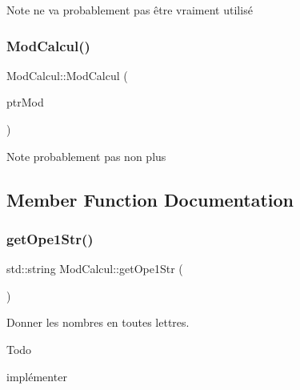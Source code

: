 \begin{DoxyNote}{Note}
ne va probablement pas être vraiment utilisé 
\end{DoxyNote}
\mbox{\label{class_mod_calcul_ad10f52bb861bf4b76e12f5bba1d97b67}} 
\subsubsection{\texorpdfstring{Mod\+Calcul()}{ModCalcul()}\hspace{0.1cm}{\footnotesize\ttfamily [2/2]}}
{\footnotesize\ttfamily Mod\+Calcul\+::\+Mod\+Calcul (\begin{DoxyParamCaption}\item[{\hyperlink{class_mod_calcul}{Mod\+Calcul} $\ast$}]{ptr\+Mod }\end{DoxyParamCaption})}

\begin{DoxyNote}{Note}
probablement pas non plus 
\end{DoxyNote}


\subsection{Member Function Documentation}
\mbox{\label{class_mod_calcul_aa16185334bb48c8e312bd0b9148aa00d}} 
\subsubsection{\texorpdfstring{get\+Ope1\+Str()}{getOpe1Str()}}
{\footnotesize\ttfamily std\+::string Mod\+Calcul\+::get\+Ope1\+Str (\begin{DoxyParamCaption}\item[{void}]{ }\end{DoxyParamCaption})}



Donner les nombres en toutes lettres. 

\begin{DoxyRefDesc}{Todo}
\item[\hyperlink{todo__todo000011}{Todo}]implémenter \end{DoxyRefDesc}
\mbox{\label{class_mod_calcul_ab725cb964df070cf7ccda5853ea918f2}} 
